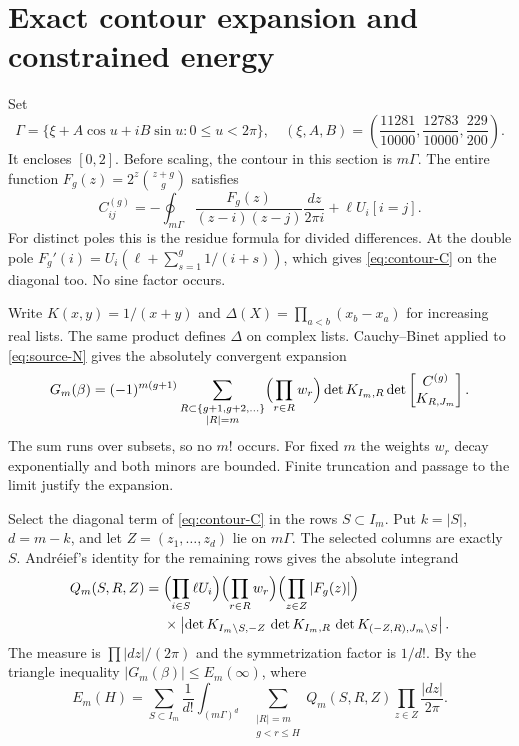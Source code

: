 \section{Exact contour expansion and constrained energy}\label{sec:contour}

Set
\[
 \Gamma=\{\xi+A\cos u+iB\sin u:0\le u<2\pi\},\quad
 (\xi,A,B)=\left(\frac{11281}{10000},
                \frac{12783}{10000},\frac{229}{200}\right).
\]
It encloses \([0,2]\). Before scaling, the contour in this section is
\(m\Gamma\). The entire function \(F_g(z)=2^z\binom{z+g}{g}\) satisfies
\begin{equation}\label{eq:contour-C}
 C^{(g)}_{ij}=-\oint_{m\Gamma}
       \frac{F_g(z)}{(z-i)(z-j)}\frac{dz}{2\pi i}
        +\ell U_i[i=j].
\end{equation}
For distinct poles this is the residue formula for divided differences. At
the double pole \(F_g'(i)=U_i(\ell+\sum_{s=1}^g1/(i+s))\), which gives
\eqref{eq:contour-C} on the diagonal too. No sine factor occurs.

Write \(K(x,y)=1/(x+y)\) and \(\Delta(X)=\prod_{a<b}(x_b-x_a)\) for
increasing real lists. The same product defines \(\Delta\) on complex lists.
Cauchy--Binet applied to \eqref{eq:source-N} gives the absolutely
convergent expansion
\begin{equation}\label{eq:contour-CB}
 G_m(\beta)=(-1)^{m(g+1)}
 \sum_{\substack{R\subset\{g+1,g+2,\ldots\}\\|R|=m}}
  \Bigl(\prod_{r\in R}w_r\Bigr)
 \det K_{I_m,R}\det\begin{bmatrix}C^{(g)}\\K_{R,J_m}\end{bmatrix}.
\end{equation}
The sum runs over subsets, so no \(m!\) occurs. For fixed \(m\) the weights
\(w_r\) decay exponentially and both minors are bounded. Finite truncation
and passage to the limit justify the expansion.

Select the diagonal term of \eqref{eq:contour-C} in the rows \(S\subset
I_m\). Put \(k=|S|\), \(d=m-k\), and let \(Z=(z_1,\ldots,z_d)\) lie on
\(m\Gamma\). The selected columns are exactly \(S\). Andr\'eief's
identity for the remaining rows gives the absolute integrand
\begin{equation}\label{eq:contour-Q}
 \begin{aligned}
 Q_m(S,R,Z)={}&\Bigl(\prod_{i\in S}\ell U_i\Bigr)
  \Bigl(\prod_{r\in R}w_r\Bigr)\Bigl(\prod_{z\in Z}|F_g(z)|\Bigr)\\
 &\times\left|\det K_{I_m\setminus S,-Z}\,\det K_{I_m,R}
               \,\det K_{(-Z,R),J_m\setminus S}\right|.
 \end{aligned}
\end{equation}
The measure is \(\prod|dz|/(2\pi)\) and the symmetrization factor is
\(1/d!\). By the triangle inequality \(|G_m(\beta)|\le E_m(\infty)\), where
\begin{equation}\label{eq:contour-E}
 E_m(H)=\sum_{S\subset I_m}\frac1{d!}
   \int_{(m\Gamma)^d}
    \sum_{\substack{|R|=m\\g<r\le H}}Q_m(S,R,Z)
                         \prod_{z\in Z}\frac{|dz|}{2\pi}.
\end{equation}

